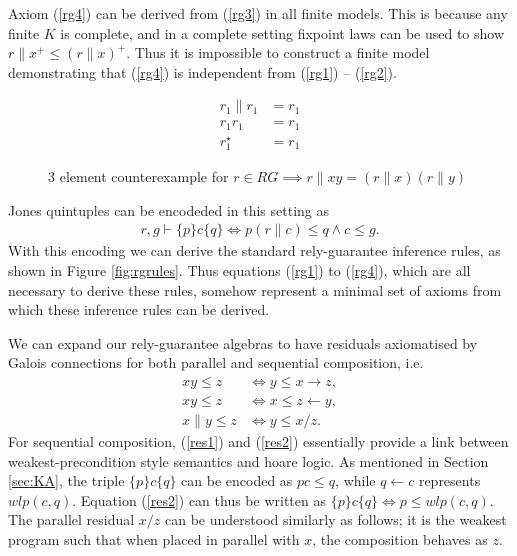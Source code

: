 \documentclass{llncs}
\begin{document}
Axiom (\ref{rg4}) can be derived from (\ref{rg3}) in all finite
models. This is because any finite $K$ is complete, and in a complete
setting fixpoint laws can be used to show $r\|x^+ \le (r\|x)^+$. Thus
it is impossible to construct a finite model demonstrating that
(\ref{rg4}) is independent from (\ref{rg1}) -- (\ref{rg2}).

\begin{figure}[t]
\centering
\begin{minipage}{0.24\textwidth}
\end{minipage}
\begin{minipage}{0.24\textwidth}
\begin{align*}
r_1 \| r_1 &= r_1\\
r_1 r_1 &= r_1\\
r_1^\star &= r_1
\end{align*}
\end{minipage}
\caption{3 element counterexample for $r \in RG \implies r\|xy = (r\|x)(r\|y)$}
\label{fig:rg3}
\end{figure}

Jones quintuples can be encodeded in this setting as
\begin{align}
r, g \vdash \{p\} c \{q\} \iff p(r\|c) \le q \land c \le g. \label{quin}
\end{align}
With this encoding we can derive the standard rely-guarantee inference
rules, as shown in Figure \ref{fig:rgrules}. Thus equations
(\ref{rg1}) to (\ref{rg4}), which are all necessary to derive these
rules, somehow represent a minimal set of axioms from which these
inference rules can be derived.

We can expand our rely-guarantee algebras to have residuals
axiomatised by Galois connections for both parallel and sequential
composition, i.e.
\begin{align}
xy \le z &\iff y \le x \rightarrow z, \label{res1}\\
xy \le z &\iff x \le z \leftarrow y, \label{res2}\\
x\|y \le z &\iff y \le x/z \label{res3}.
\end{align}
For sequential composition, (\ref{res1}) and (\ref{res2}) essentially
provide a link between weakest-precondition style semantics and hoare
logic. As mentioned in Section \ref{sec:KA}, the triple $\{p\} c
\{q\}$ can be encoded as $pc \le q$, while $q \leftarrow c$ represents
$wlp(c,q)$. Equation (\ref{res2}) can thus be written as $\{p\} c
\{q\} \iff p \le wlp(c,q)$. The parallel residual $x/z$ can be
understood similarly as follows; it is the weakest program such that
when placed in parallel with $x$, the composition behaves as $z$.
\end{document}
